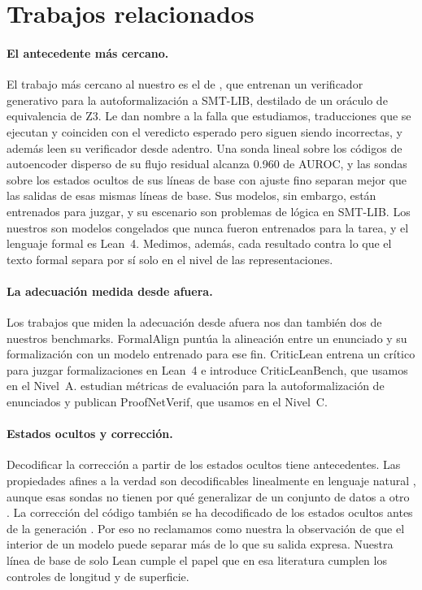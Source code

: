 \documentclass[10pt]{article}
\begin{document}
\section{Trabajos relacionados}

\paragraph{El antecedente más cercano.}
El trabajo más cercano al nuestro es el de \citet{genv}, que entrenan un verificador generativo para la
autoformalización a SMT-LIB, destilado de un oráculo de equivalencia de Z3. Le dan nombre a la falla que
estudiamos, traducciones que se ejecutan y coinciden con el veredicto esperado pero siguen siendo incorrectas, y
además leen su verificador desde adentro. Una sonda lineal sobre los códigos de autoencoder disperso de su flujo
residual alcanza 0.960 de AUROC, y las sondas sobre los estados ocultos de sus líneas de base con ajuste fino
separan mejor que las salidas de esas mismas líneas de base. Sus modelos, sin embargo, están entrenados para
juzgar, y su escenario son problemas de lógica en SMT-LIB. Los nuestros son modelos congelados que nunca fueron
entrenados para la tarea, y el lenguaje formal es Lean~4. Medimos, además, cada resultado contra lo que el texto
formal separa por sí solo en el nivel de las representaciones.

\paragraph{La adecuación medida desde afuera.}
Los trabajos que miden la adecuación desde afuera nos dan también dos de nuestros benchmarks.
FormalAlign \citep{formalalign} puntúa la alineación entre un enunciado y su formalización con un modelo entrenado
para ese fin. CriticLean \citep{criticlean} entrena un crítico para juzgar formalizaciones en Lean~4 e introduce
CriticLeanBench, que usamos en el Nivel~A. \citet{proofnetverif} estudian métricas de evaluación para la
autoformalización de enunciados y publican ProofNetVerif, que usamos en el Nivel~C.

\paragraph{Estados ocultos y corrección.}
Decodificar la corrección a partir de los estados ocultos tiene antecedentes. Las propiedades afines a la verdad
son decodificables linealmente en lenguaje natural \citep{geometry}, aunque esas sondas no tienen por qué
generalizar de un conjunto de datos a otro \citep{orgad}. La corrección del código también se ha decodificado de
los estados ocultos antes de la generación \citep{dicicco}. Por eso no reclamamos como nuestra la observación de
que el interior de un modelo puede separar más de lo que su salida expresa. Nuestra línea de base de solo Lean
cumple el papel que en esa literatura cumplen los controles de longitud y de superficie.
\end{document}
